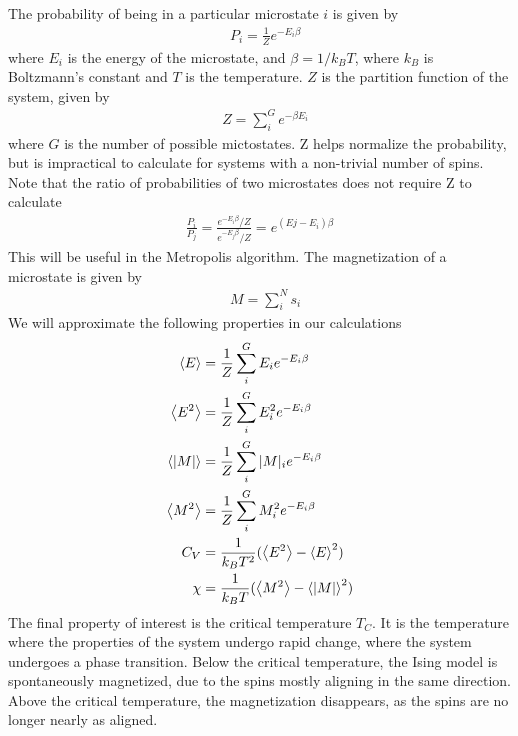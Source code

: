 \documentclass[reprint,english,notitlepage]{revtex4-1}
\begin{document}
	The probability of being in a particular microstate $i$ is given by
	\begin{equation}
	\label{eq:P}
	\begin{aligned}
	&P_i = \frac{1}{Z} e^{-E_i \beta}
	\end{aligned}
	\end{equation}
	where $E_i$ is the energy of the microstate, and $\beta = 1/k_BT$, where $k_B$ is Boltzmann's constant and $T$ is the temperature. $Z$ is the partition function of the system, given by
	\begin{equation}
	\label{eq:Z}
	\begin{aligned}
	&Z = \sum_{i}^G e^{-\beta E_i}
	\end{aligned}
	\end{equation}
	where $G$ is the number of possible mictostates. Z helps normalize the probability, but is impractical to calculate for systems with a non-trivial number of spins. Note that the ratio of probabilities of two microstates does not require Z to calculate
	\begin{equation}
	\label{eq:Pt}
	\begin{aligned}
	\frac{P_i}{P_j} = \frac{e^{-E_i \beta}/Z}{e^{-E_j \beta}/Z} = e^{(Ej - E_i) \beta}
	\end{aligned}
	\end{equation}
	This will be useful in the Metropolis algorithm. The magnetization of a microstate is given by
	\begin{equation}
	\begin{aligned}
	\label{eq:M}
	&M = \sum_{i}^N s_i
	\end{aligned}
	\end{equation}
	We will approximate the following properties in our calculations
	\begin{equation}
	\label{eq:evs}
	\begin{aligned}
		\expval{E} &= \frac{1}{Z} \sum_{i}^{G} E_i e^{-E_i \beta} \\
		\expval{E^2} &= \frac{1}{Z} \sum_{i}^{G} E_i^2 e^{-E_i \beta} \\
		\expval{|M|} &= \frac{1}{Z} \sum_{i}^{G} |M|_i e^{-E_i \beta} \\
		\expval{M^2} &= \frac{1}{Z} \sum_{i}^{G} M_i^2 e^{-E_i \beta} \\
		C_V &= \frac{1}{k_B T^2} (\expval{E^2} - \expval{E}^2) \\
		\chi &= \frac{1}{k_B T} (\expval{M^2} - \expval{|M|}^2)
	\end{aligned}
	\end{equation}
	The final property of interest is the critical temperature $T_C$. It is the temperature where the properties of the system undergo rapid change, where the system undergoes a phase transition. Below the critical temperature, the Ising model is spontaneously magnetized, due to the spins mostly aligning in the same direction. Above the critical temperature, the magnetization disappears, as the spins are no longer nearly as aligned.
	
\end{document}
